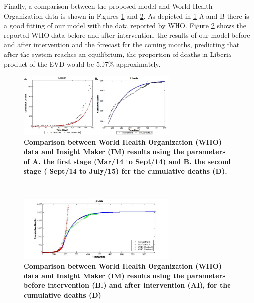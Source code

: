\documentclass[10pt]{article}
\begin{document}

\noindent Finally, a comparison between the proposed model and World Health Organization data is shown in Figures \ref{fig:LB_IM_WHO} and \ref{fig:LB_IM_WHO2}. As depicted in \ref{fig:LB_IM_WHO} A and B there is a good fitting of our model with the data reported by WHO. Figure \ref{fig:LB_IM_WHO2} shows  the reported WHO data before and after intervention, the results of our model before and after intervention and the forecast for the coming months, predicting that after the system reaches an equilibrium, the proportion of deaths in Liberia product of the EVD would be 5.07\% approximately.\\


\begin{figure}[!h]
  \centering
  \includegraphics[width=0.7\textwidth]{LB_BI_AI_SD_WHO_IM}
  \caption{ \bf Comparison between World Health Organization (WHO) data and Insight Maker (IM) results using the parameters of A. the first stage (Mar/14 to Sept/14) and B. the second stage ( Sept/14 to July/15) for the cumulative deaths (D).}
\label{fig:LB_IM_WHO} 
\end{figure}\\



\begin{figure}[!h]
  \centering
  \includegraphics[width=0.7\textwidth]{LB_Int2_SD_WHO_IM}
  \caption{ \bf Comparison between World Health Organization (WHO) data and Insight Maker (IM) results using the parameters before intervention (BI) and after intervention (AI), for the cumulative deaths (D).}
\label{fig:LB_IM_WHO2} 
\end{figure}\\
\end{document}

